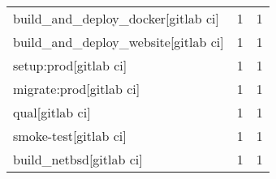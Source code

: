 \begin{tabular}{lrr}
build\_and\_deploy\_docker[gitlab ci]         &                   1 &             1 \\
build\_and\_deploy\_website[gitlab ci]        &                   1 &             1 \\
setup:prod[gitlab ci]                      &                   1 &             1 \\
migrate:prod[gitlab ci]                    &                   1 &             1 \\
qual[gitlab ci]                            &                   1 &             1 \\
smoke-test[gitlab ci]                      &                   1 &             1 \\
build\_netbsd[gitlab ci]                    &                   1 &             1 \\
\bottomrule
\end{tabular}
